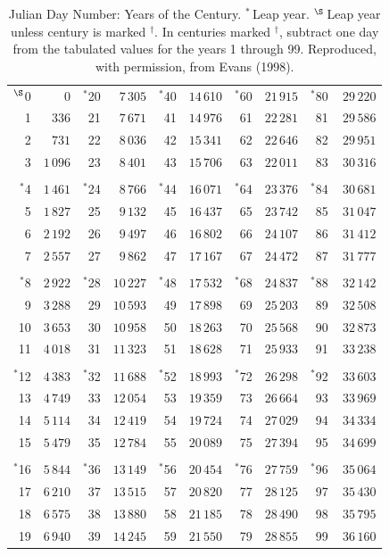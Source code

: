 \clearpage
\begin{table}[!h]\centering
\vspace{0.25cm}
\begin{tabular}{rr|rr|rr|rr|rr}
$^\S$0 & $0$ & $^\ast$20 & $7\,305$ & $^\ast$40 & $14$\,610 & $^\ast$60 &$21\,915$ & $^\ast$80 & $29\,220$\\
1 & $336$ & 21 & $7\,671$ & 41 & $14\,976$ & 61 &$22\,281$ & 81& $\,29\,586$\\
2 & $731$ & 22 & $8\,036$ & 42 & $15\,341$ & 62 & $22\,646$ & 82 & $29\,951$\\
3 & $1\,096$ & 23 & $8\,401$ & 43 & $15\,706$ & 63 & $22\,011$& 83 &$ 30\,316$\\
&&&&&&&\\
$^\ast$4& $1\,461$& $^\ast$24& $8\,766$& $^\ast$44 & $16\,071$ & $^\ast$64 & $23\,376$& $^\ast$84 & $30\,681$\\
5 & $1\,827$ & 25 & $9\,132$& 45 & $16\,437$& 65& $23\,742$& 85& $31\,047$\\
6& $2\,192$& 26& $9\,497$& 46& $16\,802$& 66& $24\,107$& 86& $31\,412$\\
7& $2\,557$&27&$9\,862$ & 47 & $17\,167$& 67& $24\,472$& 87& $31\,777$\\
&&&&&&&\\
$^\ast$8 & $2\,922$& $^\ast$28 & $10\,227$ & $^\ast 48$ & $17\,532$ & $^\ast 68$ & $24\,837$& $^\ast$88& $32\,142$\\
9 & $3\,288$& 29 & $10\,593$& 49& $17\,898$& 69& $25\,203$& 89& $32\,508$\\
10& $3\,653$& 30 & $10\,958$& 50& $18\,263$& 70& $25\,568$& 90& $32\,873$\\
11& $4\,018$& 31& $11\,323$& 51& $18\,628$& 71& $25\,933$& 91& $33\,238$\\
&&&&&&&\\
$^\ast$12& $4\,383$& $^\ast$32 & $11\,688$ & $^\ast$52 & $18\,993$ &
$^\ast$72 & $26\,298$ & $^\ast$92 & $33\,603$\\
13 & $4\,749$ & 33 & $12\,054$& 53& $19\,359$ & 73& $26\,664$ & 93& $33\,969$\\
14 & $5\,114$ & 34 & $12\,419$ & 54 & $19\,724$ & 74& $27\,029$ & 94&$34\,334$\\
15& $5\,479$ & 35& $12\,784$& 55 & $20\,089$ & 75& $27\,394$ & 95 & $34\,699$\\
&&&&&&&\\
$^\ast$16 & $5\,844$& $^\ast$36& $13\,149$& $^\ast$56 & $20\,454$& $^\ast$76&$27\,759$ & $^\ast$96& $35\,064$\\
17& $6\,210$& 37& $13\,515$& 57& $20\,820$& 77& $28\,125$& 97& $35\,430$\\
18& $6\,575$& 38& $13\,880$& 58& $21\,185$& 78& $28\,490$& 98& $35\,795$\\
19& $6\,940$& 39& $14\,245$& 59& $21\,550$& 79& $28\,855$& 99&$36\,160$\\
\end{tabular}
\caption{Julian Day Number: Years of the Century. $^\ast$\,Leap year. $^\S$\,Leap year unless century is marked $^\dag$. In centuries marked $^\dag$, subtract one day from the tabulated values for the years 1 through 99.
Reproduced, with permission, from Evans (1998).}\label{kt2}
\end{table}

